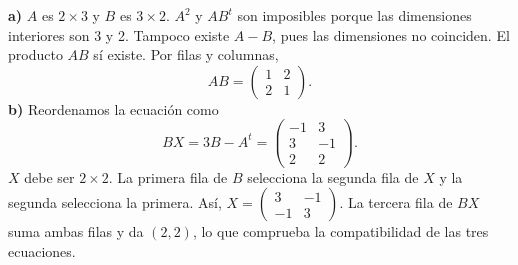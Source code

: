 \textbf{a)} $A$ es $2\times3$ y $B$ es $3\times2$.
$A^2$ y $AB^t$ son imposibles porque las dimensiones interiores
son 3 y 2. Tampoco existe $A-B$, pues las dimensiones no coinciden.
El producto $AB$ sí existe. Por filas y columnas,
\[
AB=\boxed{\begin{pmatrix}1&2\\2&1\end{pmatrix}}.
\]
\textbf{b)} Reordenamos la ecuación como
\[
BX=3B-A^t=\begin{pmatrix}-1&3\\3&-1\\2&2\end{pmatrix}.
\]
$X$ debe ser $2\times2$. La primera fila de $B$ selecciona
la segunda fila de $X$ y la segunda selecciona la primera.
Así, $X=\boxed{\begin{pmatrix}3&-1\\-1&3\end{pmatrix}}$.
La tercera fila de $BX$ suma ambas filas y da $(2,2)$,
lo que comprueba la compatibilidad de las tres ecuaciones.
